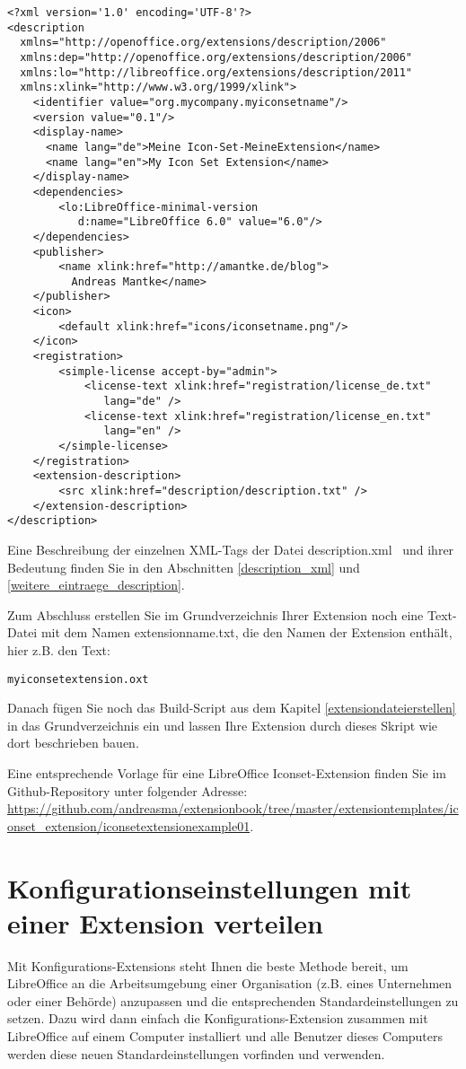 \documentclass[a4paper,10pt,pagesize,titlepage]{scrbook}
\begin{document}
\begin{lstlisting}
<?xml version='1.0' encoding='UTF-8'?>
<description
  xmlns="http://openoffice.org/extensions/description/2006"
  xmlns:dep="http://openoffice.org/extensions/description/2006"
  xmlns:lo="http://libreoffice.org/extensions/description/2011"
  xmlns:xlink="http://www.w3.org/1999/xlink">
    <identifier value="org.mycompany.myiconsetname"/>
    <version value="0.1"/>
    <display-name>
      <name lang="de">Meine Icon-Set-MeineExtension</name>
      <name lang="en">My Icon Set Extension</name>
    </display-name>
    <dependencies>
        <lo:LibreOffice-minimal-version 
           d:name="LibreOffice 6.0" value="6.0"/>
    </dependencies>
    <publisher>
        <name xlink:href="http://amantke.de/blog">
          Andreas Mantke</name>
    </publisher>
    <icon>
        <default xlink:href="icons/iconsetname.png"/>
    </icon>
    <registration>
        <simple-license accept-by="admin">
            <license-text xlink:href="registration/license_de.txt" 
               lang="de" />
            <license-text xlink:href="registration/license_en.txt" 
               lang="en" />
        </simple-license>
    </registration>
    <extension-description>
        <src xlink:href="description/description.txt" />
    </extension-description>
</description>
\end{lstlisting}
    
Eine Beschreibung der einzelnen XML-Tags der Datei \glqq description.xml\grqq~ und ihrer Bedeutung finden Sie in den Abschnitten \ref{description_xml} und \ref{weitere_eintraege_description}.

Zum Abschluss erstellen Sie im Grundverzeichnis Ihrer Extension noch eine Text-Datei mit dem Namen \glqq extensionname.txt\grqq, die den Namen der Extension enthält, hier z.B. den Text:
\begin{lstlisting}
myiconsetextension.oxt
\end{lstlisting}

Danach fügen Sie noch das Build-Script aus dem Kapitel \ref{extensiondateierstellen} in das Grundverzeichnis ein und lassen Ihre Extension durch dieses Skript wie dort beschrieben bauen.

Eine entsprechende Vorlage für eine LibreOffice Iconset-Extension finden Sie im Github-Repository unter folgender Adresse:
\url{https://github.com/andreasma/extensionbook/tree/master/extensiontemplates/iconset_extension/iconsetextensionexample01}.

\chapter{Konfigurationseinstellungen mit einer Extension verteilen}

Mit Konfigurations-Extensions steht Ihnen die beste Methode bereit, um LibreOffice an die Arbeitsumgebung einer Organisation (z.B. eines Unternehmen oder einer Behörde) anzupassen und die entsprechenden Standardeinstellungen zu setzen. Dazu wird dann einfach die Konfigurations-Extension zusammen mit LibreOffice auf einem Computer installiert und alle Benutzer dieses Computers werden diese neuen Standardeinstellungen vorfinden und verwenden.
\end{document}
